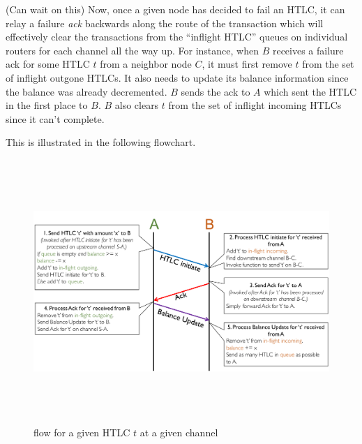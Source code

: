 \documentclass[a4paper]{article}
\newcommand{\NewPara}[1]{\noindent{\bf #1}}
\begin{document}
\bigskip

\NewPara{Failure Acks} (Can wait on this) Now, once a given node has decided to fail an HTLC, it can relay a failure {\em{ack}} backwards along the route of the transaction which will effectively clear 
the transactions from the ``inflight HTLC'' queues on individual routers for each channel all the way up. For instance, when $B$ receives a failure ack for some HTLC
$t$ from a neighbor node $C$, it must first remove $t$ from the set of inflight outgone HTLCs. It also needs to update its balance information since the balance was already decremented. 
$B$ sends the ack to $A$ which sent the HTLC in the first place to $B$. $B$ also clears $t$ from
the set of inflight incoming HTLCs since it can't complete.


This is illustrated in the following flowchart.
\begin{figure}[h]
\includegraphics[width=\linewidth,height=10cm]{htlcAckFlow.pdf}
\caption{flow for a given HTLC $t$ at a given channel}
\label{fig:htlcflow}
\end{figure}
\end{document}
